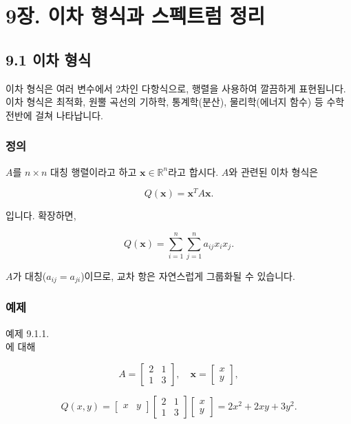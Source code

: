 \documentclass[
  12pt,
  a4paper,
]{article}
\let\oldsection\section
\renewcommand{\section}{\clearpage\oldsection}
\begin{document}
\section{9장. 이차 형식과 스펙트럼 정리}\label{chapter-9-quadratic-forms-and-spectral-theorems}

\subsection{9.1 이차 형식}\label{91-quadratic-forms}

이차 형식은 여러 변수에서 2차인 다항식으로, 행렬을 사용하여 깔끔하게 표현됩니다. 이차 형식은 최적화, 원뿔 곡선의 기하학, 통계학(분산), 물리학(에너지 함수) 등 수학 전반에 걸쳐 나타납니다.

\subsubsection{정의}\label{definition-8}

\(A\)를 \(n \times n\) 대칭 행렬이라고 하고 \(\mathbf{x} \in \mathbb{R}^n\)라고 합시다. \(A\)와 관련된 이차 형식은

\[Q(\mathbf{x}) = \mathbf{x}^T A \mathbf{x}.\]

입니다. 확장하면,

\[Q(\mathbf{x}) = \sum_{i=1}^n \sum_{j=1}^n a_{ij} x_i x_j.\]

\(A\)가 대칭(\(a_{ij} = a_{ji}\))이므로, 교차 항은 자연스럽게 그룹화될 수 있습니다.

\subsubsection{예제}\label{examples-9}

예제 9.1.1.\\
에 대해

\[A = \begin{bmatrix}
2 & 1 \\
1 & 3 \end{bmatrix}, \quad \mathbf{x} = \begin{bmatrix}
x \\
y \end{bmatrix},\]

\[Q(x,y) = \begin{bmatrix} x & y \end{bmatrix}
\begin{bmatrix}
2 & 1 \\
1 & 3 \end{bmatrix}
\begin{bmatrix}
x \\
y \end{bmatrix}
= 2x^2 + 2xy + 3y^2.\]
\end{document}
